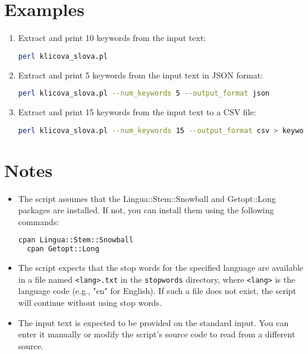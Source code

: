 \documentclass{article}
\begin{document}
\section{Examples}
\begin{enumerate}
  \item Extract and print 10 keywords from the input text:
  \begin{lstlisting}[language=bash]
  perl klicova_slova.pl
  \end{lstlisting}

  \item Extract and print 5 keywords from the input text in JSON format:
  \begin{lstlisting}[language=bash]
  perl klicova_slova.pl --num_keywords 5 --output_format json
  \end{lstlisting}

  \item Extract and print 15 keywords from the input text to a CSV file:
  \begin{lstlisting}[language=bash]
  perl klicova_slova.pl --num_keywords 15 --output_format csv > keywords.csv
  \end{lstlisting}
\end{enumerate}

\section{Notes}
\begin{itemize}
  \item The script assumes that the Lingua::Stem::Snowball and Getopt::Long packages are installed. If not, you can install them using the following commands:
  \begin{lstlisting}[language=bash]
  cpan Lingua::Stem::Snowball
  cpan Getopt::Long
  \end{lstlisting}

  \item The script expects that the stop words for the specified language are available in a file named \texttt{<lang>.txt} in the \texttt{stopwords} directory, where \texttt{<lang>} is the language code (e.g., "en" for English). If such a file does not exist, the script will continue without using stop words.

  \item The input text is expected to be provided on the standard input. You can enter it manually or modify the script's source code to read from a different source.
\end{itemize}
\end{document}
